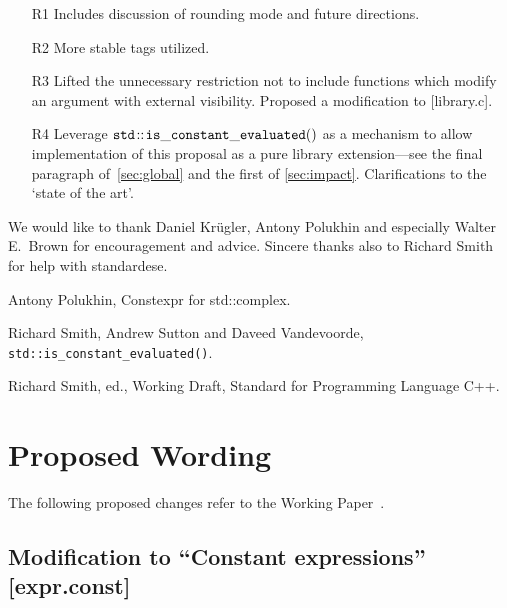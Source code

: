 \documentclass[prd,twocolumn,amsmath,amssymb,nofootinbib,eqsecnum]{revtex4-1}
\newcommand{\code}[1]{{\tt #1}}
\begin{document}
\begin{enumerate}
	\item[R1] Includes discussion of rounding mode and future directions. 
	
	\item[R2] More stable tags utilized.
	
	\item[R3] Lifted the unnecessary restriction not to include functions which modify an argument with external visibility. Proposed a modification to [library.c].
	
	\item [R4] Leverage $\code{std\!::\!is\_constant\_evaluated()}$ as a mechanism to allow implementation of this proposal as a pure library extension---see the final paragraph of~\ref{sec:global} and the first of \ref{sec:impact}. Clarifications to the `state of the art'.
\end{enumerate}

\begin{acknowledgments}
	We would like to thank Daniel Kr\"ugler, Antony Polukhin and especially Walter E.~Brown 
	for encouragement and advice. Sincere thanks also to Richard Smith for help with standardese.
\end{acknowledgments}


\begin{thebibliography}{1}
	 Antony Polukhin, Constexpr for std::complex.	
	
	 Richard Smith, Andrew Sutton and Daveed Vandevoorde, \code{std\!::\!is\_constant\_evaluated()}.
	
	 Richard Smith, ed., Working Draft, Standard for Programming Language C++.	
\end{thebibliography}

\newpage

\onecolumngrid

\section{Proposed Wording}

\setlength{\parindent}{0pt}


The following proposed changes refer to the Working Paper~\cite{WorkingPaper}.

\subsection{Modification to ``Constant expressions'' [expr.const]}
\end{document}
